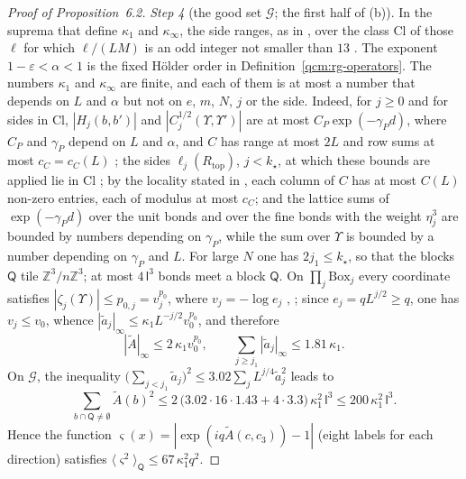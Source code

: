 \documentclass[11pt,letterpaper,reqno]{amsart}
\theoremstyle{definition}
\begin{document}
\begin{proof}[Proof of Proposition~6.2]
\emph{Step 4} (the good set $\mathcal G$; the first half of (b)).
In the suprema that define $\kappa_1$ and $\kappa_\infty$, the side ranges, as in \cite[Proposition~16.1 and Sections~15--16]{QEDConstruction}, over the class $\mathrm{Cl}$ of those $\ell$ for which $\ell/(LM)$ is an odd integer not smaller than $13$ \cite[Proposition~16.1]{QEDConstruction}.
The exponent $1-\varepsilon<\alpha<1$ is the fixed H\"older order in Definition~\ref{qcm:rg-operators}.
The numbers $\kappa_1$ and $\kappa_\infty$ are finite, and each of them is at most a number that depends on $L$ and $\alpha$ but not on $e$, $m$, $N$, $j$ or the side.
Indeed, for $j\ge0$ and for sides in $\mathrm{Cl}$, $|H_j(b,b')|$ and $|C_j^{1/2}(\Upsilon,\Upsilon')|$ are at most $C_P\exp(-\gamma_Pd)$, where $C_P$ and $\gamma_P$ depend on $L$ and $\alpha$, and $C$ has range at most $2L$ and row sums at most $c_C=c_C(L)$ \cite[equations~(10.16), (10.21)--(10.22), (10.26)]{QEDConstruction};
the sides $\ell_j(R_{\mathrm{top}})$, $j<k_\star$, at which these bounds are applied lie in $\mathrm{Cl}$ \cite[Proposition~16.1 and Section~16.1]{QEDConstruction};
by the locality stated in \cite[equations~(10.21)--(10.22)]{QEDConstruction}, each column of $C$ has at most $C(L)$ non-zero entries, each of modulus at most $c_C$;
and the lattice sums of $\exp(-\gamma_Pd)$ over the unit bonds and over the fine bonds with the weight $\eta_j^3$ are bounded by numbers depending on $\gamma_P$, while the sum over $\Upsilon$ is bounded by a number depending on $\gamma_P$ and $L$.
For large $N$ one has $2j_1\le k_\star$, so that the blocks $\mathsf Q$ tile $\mathbb Z^3/n\mathbb Z^3$;
at most $4\,\mathsf l^3$ bonds meet a block $\mathsf Q$.
On $\prod_j\mathrm{Box}_j$ every coordinate satisfies $|\zeta_j(\Upsilon)|\le p_{0,j}=v_j^{p_0}$, where $v_j=-\log e_j$ \cite[Section~10.5, equations~(10.21)--(10.29), and Section~13.3]{QEDConstruction}, \cite[Proposition~16.1 and Sections~15--16]{QEDConstruction};
since $e_j=qL^{j/2}\ge q$, one has $v_j\le v_0$, whence $|\tilde a_j|_\infty\le\kappa_1L^{-j/2}v_0^{p_0}$, and therefore
\begin{equation*}
|\tilde A|_\infty\le2\,\kappa_1v_0^{p_0},\qquad\sum_{j\ge j_1}|\tilde a_j|_\infty\le1.81\,\kappa_1 .
\end{equation*}
On $\mathcal G$, the inequality $\bigl(\sum_{j<j_1}\tilde a_j\bigr)^2\le3.02\sum_jL^{j/4}\tilde a_j^2$ leads to
\begin{equation*}
\sum_{b\cap\mathsf Q\ne\emptyset}\tilde A(b)^2\le2\,\bigl(3.02\cdot16\cdot1.43+4\cdot3.3\bigr)\,\kappa_1^2\,\mathsf l^3\le200\,\kappa_1^2\,\mathsf l^3 .
\end{equation*}
Hence the function $\varsigma(x)=|\exp(iq\tilde A(c,c_3))-1|$ (eight labels for each direction) satisfies $\langle\varsigma^2\rangle_{\mathsf Q}\le67\,\kappa_1^2q^2$.


\end{proof}
\end{document}
